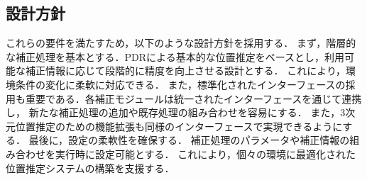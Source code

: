 \subsection{設計方針}
これらの要件を満たすため，以下のような設計方針を採用する．
まず，階層的な補正処理を基本とする．PDRによる基本的な位置推定をベースとし，利用可能な補正情報に応じて段階的に精度を向上させる設計とする．
これにより，環境条件の変化に柔軟に対応できる．
また，標準化されたインターフェースの採用も重要である．各補正モジュールは統一されたインターフェースを通じて連携し，
新たな補正処理の追加や既存処理の組み合わせを容易にする．
また，3次元位置推定のための機能拡張も同様のインターフェースで実現できるようにする．
最後に，設定の柔軟性を確保する．
補正処理のパラメータや補正情報の組み合わせを実行時に設定可能とする．
これにより，個々の環境に最適化された位置推定システムの構築を支援する．

